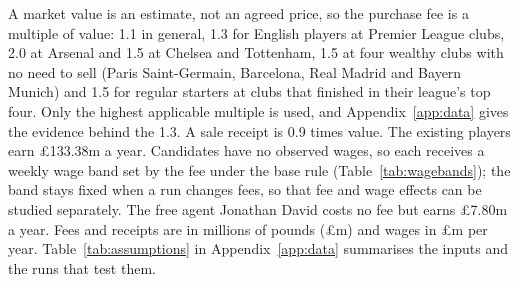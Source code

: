 A market value is an estimate, not an agreed price, so the purchase fee is a multiple of value: 1.1 in general, 1.3 for English players at Premier League clubs, 2.0 at Arsenal and 1.5 at Chelsea and Tottenham, 1.5 at four wealthy clubs with no need to sell (Paris Saint-Germain, Barcelona, Real Madrid and Bayern Munich) and 1.5 for regular starters at clubs that finished in their league's top four. Only the highest applicable multiple is used, and Appendix~\ref{app:data} gives the evidence behind the 1.3. A sale receipt is 0.9 times value. The existing players earn \pounds 133.38m a year. Candidates have no observed wages, so each receives a weekly wage band set by the fee under the base rule (Table~\ref{tab:wagebands}); the band stays fixed when a run changes fees, so that fee and wage effects can be studied separately. The free agent Jonathan David \citep{bein2025david} costs no fee but earns \pounds 7.80m a year. Fees and receipts are in millions of pounds (\pounds m) and wages in \pounds m per year. Table~\ref{tab:assumptions} in Appendix~\ref{app:data} summarises the inputs and the runs that test them.
